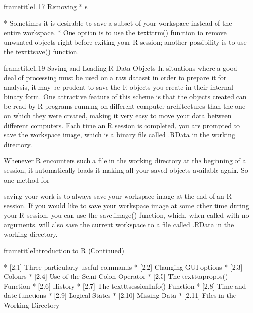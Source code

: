  	
 	
 		frametitle{1.17 Removing         * s}
 		
 			         * Sometimes it is desirable to save a subset of your workspace instead of the entire workspace.
 			         * One option is to use the texttt{rm()} function to remove unwanted objects right before exiting your R
 			session; another possibility is to use the texttt{save()} function.
 		
 	
 	
 	
 
 	
 		frametitle{1.19 Saving and Loading R Data Objects}
 		In situations where a good deal of processing must be used on a raw dataset in order to prepare
 		it for analysis, it may be prudent to save the R objects you create in their internal binary form.
 		One attractive feature of this scheme is that the objects created can be read by R programs
 		running on different computer architectures than the one on which they were created, making it
 		very easy to move your data between different computers. Each time an R session is completed,
 		you are prompted to save the workspace image, which is a binary file called .RData in the
 		working directory.
 	
 	
 		Whenever R encounters such a file in the working directory at the beginning of a session,
 		it automatically loads it making all your saved objects available again. So one method for
 		
 		saving your work is to always save your workspace image at the end of an R session. If you
 		would like to save your workspace image at some other time during your R session, you can use
 		the save.image() function, which, when called with no arguments, will also save the current
 		workspace to a file called .RData in the working directory.
 		
 	
 	
 		frametitle{Introduction to R (Continued) }
 		
 			        * [2.1] Three particularly useful commands    
 			        * [2.2] Changing GUI options     
 			        * [2.3] Colours      
 			        * [2.4] Use of the Semi-Colon Operator     
 			        * [2.5] The texttt{apropos()} Function     
 			        * [2.6] History       
 			        * [2.7] The texttt{sessionInfo()} Function     
 			        * [2.8] Time and date functions     
 			        * [2.9] Logical States      
 			        * [2.10] Missing Data      
 			        * [2.11] Files in the Working Directory     
 		
